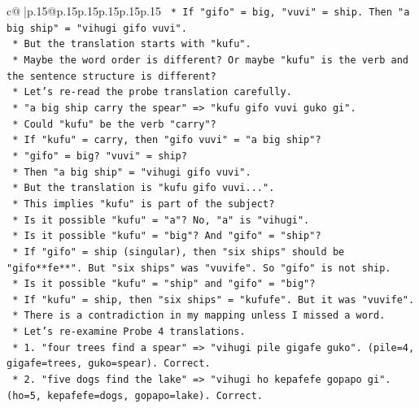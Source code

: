 \documentclass{article}
\begin{document}
{\begin{supertabular}{c@{$\;$}|p{.15\linewidth}@{}p{.15\linewidth}p{.15\linewidth}p{.15\linewidth}p{.15\linewidth}p{.15\linewidth}}
{{{\texttt{                    *   If "gifo" = big, "vuvi" = ship. Then "a big ship" = "vihugi gifo vuvi".} \\
\texttt{                    *   But the translation starts with "kufu".} \\
\texttt{                    *   Maybe the word order is different? Or maybe "kufu" is the verb and the sentence structure is different?} \\
\texttt{                    *   Let's re{-}read the probe translation carefully.} \\
\texttt{                    *   "a big ship carry the spear" => "kufu gifo vuvi guko gi".} \\
\texttt{                    *   Could "kufu" be the verb "carry"?} \\
\texttt{                    *   If "kufu" = carry, then "gifo vuvi" = "a big ship"?} \\
\texttt{                    *   "gifo" = big? "vuvi" = ship?} \\
\texttt{                    *   Then "a big ship" = "vihugi gifo vuvi".} \\
\texttt{                    *   But the translation is "kufu gifo vuvi...".} \\
\texttt{                    *   This implies "kufu" is part of the subject?} \\
\texttt{                    *   Is it possible "kufu" = "a"? No, "a" is "vihugi".} \\
\texttt{                    *   Is it possible "kufu" = "big"? And "gifo" = "ship"?} \\
\texttt{                    *   If "gifo" = ship (singular), then "six ships" should be "gifo**fe**". But "six ships" was "vuvife". So "gifo" is not ship.} \\
\texttt{                    *   Is it possible "kufu" = "ship" and "gifo" = "big"?} \\
\texttt{                    *   If "kufu" = ship, then "six ships" = "kufufe". But it was "vuvife".} \\
\texttt{                    *   There is a contradiction in my mapping unless I missed a word.} \\
\texttt{                    *   Let's re{-}examine Probe 4 translations.} \\
\texttt{                    *   1. "four trees find a spear" => "vihugi pile gigafe guko". (pile=4, gigafe=trees, guko=spear). Correct.} \\
\texttt{                    *   2. "five dogs find the lake" => "vihugi ho kepafefe gopapo gi". (ho=5, kepafefe=dogs, gopapo=lake). Correct.} \\
}}}
\end{supertabular}}
\end{document}
